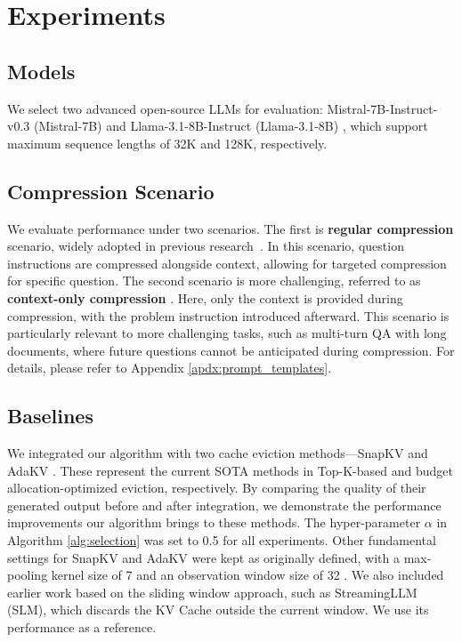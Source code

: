 
\section{Experiments}



\subsection{Models}
We select two advanced open-source LLMs for evaluation: Mistral-7B-Instruct-v0.3 (Mistral-7B) \citep{jiang2023mistral} and Llama-3.1-8B-Instruct (Llama-3.1-8B) \citep{dubey2024llama}, which support maximum sequence lengths of 32K and 128K, respectively. 



\subsection{Compression Scenario}
We evaluate performance under two scenarios. The first is \textbf{regular compression} scenario, widely adopted in previous research~\cite{SnapKV,ada}. In this scenario, question instructions are compressed alongside context, allowing for targeted compression for specific question. The second scenario is more challenging, referred to as \textbf{context-only compression} \cite{kvpress}. Here, only the context is provided during compression, with the problem instruction introduced afterward. This scenario is particularly relevant to more challenging tasks, such as multi-turn QA with long documents, where future questions cannot be anticipated during compression. For details, please refer to Appendix \ref{apdx:prompt_templates}.


\subsection{Baselines}


We integrated our algorithm with two cache eviction methods—SnapKV \citep{SnapKV} and AdaKV \citep{ada}. These represent the current SOTA methods in Top-K-based and budget allocation-optimized eviction, respectively. By comparing the quality of their generated output before and after integration, we demonstrate the performance improvements our algorithm brings to these methods.
The hyper-parameter $\alpha$ in Algorithm \ref{alg:selection} was set to 0.5 for all experiments. Other fundamental settings for SnapKV and AdaKV were kept as originally defined, with a max-pooling kernel size of 7 and an observation window size of 32 \cite{ada}.  We also included earlier work based on the sliding window approach, such as StreamingLLM (SLM), which discards the KV Cache outside the current window. We use its performance as a reference. %






